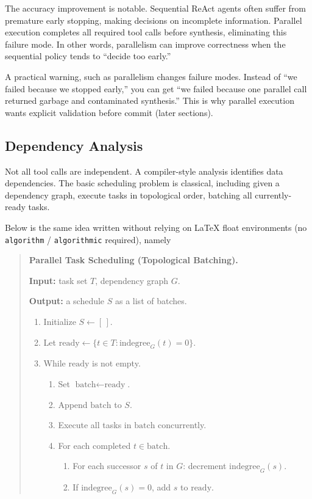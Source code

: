 The accuracy improvement is notable. Sequential ReAct agents often suffer from premature early stopping, making decisions on incomplete information. Parallel execution completes all required tool calls before synthesis, eliminating this failure mode. In other words, parallelism can improve correctness when the sequential policy tends to ``decide too early.''

A practical warning, such as parallelism changes failure modes. Instead of ``we failed because we stopped early,'' you can get ``we failed because one parallel call returned garbage and contaminated synthesis.'' This is why parallel execution wants explicit validation before commit (later sections).

\subsection{Dependency Analysis}

Not all tool calls are independent. A compiler-style analysis identifies data dependencies. The basic scheduling problem is classical, including given a dependency graph, execute tasks in topological order, batching all currently-ready tasks.

Below is the same idea written without relying on LaTeX float environments (no \texttt{algorithm} / \texttt{algorithmic} required), namely \begin{quote}
\textbf{Parallel Task Scheduling (Topological Batching).}

\textbf{Input:} task set $T$, dependency graph $G$.

\textbf{Output:} a schedule $S$ as a list of batches.

\begin{enumerate}
\item Initialize $S \leftarrow [\,]$.
\item Let $\text{ready} \leftarrow \{t \in T : \text{indegree}_G(t)=0\}$.
\item While $\text{ready}$ is not empty.
  \begin{enumerate}
  \item Set $\text{batch} \leftarrow \text{ready}$.
  \item Append $\text{batch}$ to $S$.
  \item Execute all tasks in $\text{batch}$ concurrently.
  \item For each completed $t \in \text{batch}$.
    \begin{enumerate}
    \item For each successor $s$ of $t$ in $G$: decrement $\text{indegree}_G(s)$.
    \item If $\text{indegree}_G(s)=0$, add $s$ to $\text{ready}$.
    \end{enumerate}
  \end{enumerate}
\end{enumerate}
\end{quote}

